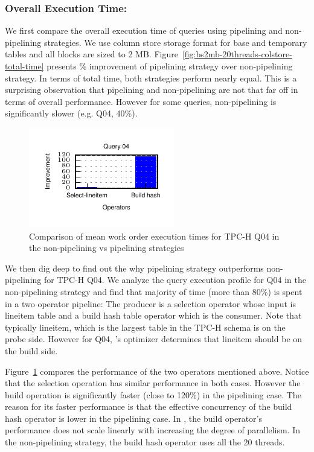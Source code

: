 \subsubsection{Overall Execution Time:}\label{ssec:overall-execution-time} We first compare the overall execution time of queries using pipelining and non-pipelining strategies. 
We use column store storage format for base and temporary tables and all blocks are sized to 2 MB.
Figure~\ref{fig:bs2mb-20threads-colstore-total-time} presents \% improvement of pipelining strategy over non-pipelining strategy.
In terms of total time, both strategies perform nearly equal. 
This is a surprising observation that pipelining and non-pipelining are not that far off in terms of overall performance. 
However for some queries, non-pipelining is significantly slower (e.g. Q04, 40\%). 

\begin{figure}
	\centering 
	\includegraphics[width=0.3\textheight]{pipeline/figures/tpch-q04-ccs-20threads-bs2mb-meanwo}
	\caption{Comparison of mean work order execution times for TPC-H Q04 in the non-pipelining vs pipelining strategies}
	\label{fig:tpch-q04-ccs-meanwo}
\end{figure}

We then dig deep to find out the why pipelining strategy outperforms non-pipelining for TPC-H Q04. 
We analyze the query execution profile for Q04 in the non-pipelining strategy and find that majority of time (more than 80\%) is spent in a two operator pipeline: The producer is a selection operator whose input is lineitem table and a build hash table operator which is the consumer. 
Note that typically lineitem, which is the largest table in the TPC-H schema is on the probe side. 
However for Q04, \sys{}'s optimizer determines that lineitem should be on the build side.  

Figure~\ref{fig:tpch-q04-ccs-meanwo} compares the performance of the two operators mentioned above.
Notice that the selection operation has similar performance in both cases. 
However the build operation is significantly faster (close to 120\%) in the pipelining case.
The reason for its faster performance is that the effective concurrency of the build hash operator is lower in the pipelining case.
In \sys{}, the build operator's performance does not scale linearly with increasing the degree of parallelism. 
In the non-pipelining strategy, the build hash operator uses all the 20 threads.

